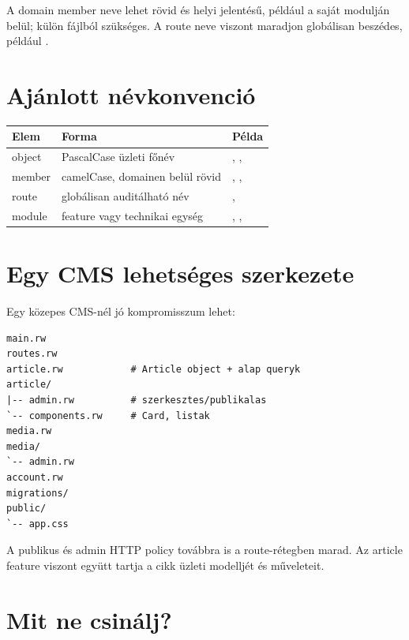 A domain member neve lehet rövid és helyi jelentésű, például  a saját modulján belül; külön  fájlból  szükséges. A route neve viszont maradjon globálisan beszédes, például .

\section{Ajánlott névkonvenció}

\begin{center}
\begin{tabularx}{\textwidth}{@{}l l Y@{}}
\toprule
\textbf{Elem} & \textbf{Forma} & \textbf{Példa} \\
\midrule
object & PascalCase üzleti főnév & , ,  \\
member & camelCase, domainen belül rövid & , ,  \\
route & globálisan auditálható név & ,  \\
module & feature vagy technikai egység & , ,  \\
\bottomrule
\end{tabularx}
\end{center}

\section{Egy CMS lehetséges szerkezete}

Egy közepes CMS-nél jó kompromisszum lehet:

\begin{lstlisting}
main.rw
routes.rw
article.rw            # Article object + alap queryk
article/
|-- admin.rw          # szerkesztes/publikalas
`-- components.rw     # Card, listak
media.rw
media/
`-- admin.rw
account.rw
migrations/
public/
`-- app.css
\end{lstlisting}

A publikus és admin HTTP policy továbbra is a route-rétegben marad. Az article feature viszont együtt tartja a cikk üzleti modelljét és műveleteit.

\section{Mit ne csinálj?}

